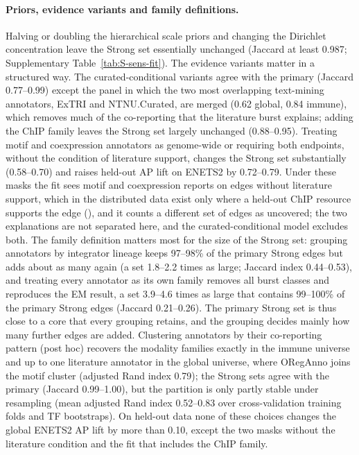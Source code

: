 \documentclass[11pt,a4paper]{article}
\begin{document}
\paragraph{Priors, evidence variants and family definitions.}
Halving or doubling the hierarchical scale priors and changing the Dirichlet concentration leave the Strong set essentially unchanged (Jaccard at least 0.987; Supplementary Table~\ref{tab:S-sens-fit}).
The evidence variants matter in a structured way.
The curated-conditional variants agree with the primary (Jaccard 0.77--0.99) except the panel in which the two most overlapping text-mining annotators, ExTRI and NTNU.Curated, are merged (0.62 global, 0.84 immune), which removes much of the co-reporting that the literature burst explains; adding the ChIP family leaves the Strong set largely unchanged (0.88--0.95).
Treating motif and coexpression annotators as genome-wide or requiring both endpoints, without the condition of literature support, changes the Strong set substantially (0.58--0.70) and raises held-out AP lift on ENETS2 by 0.72--0.79.
Under these masks the fit sees motif and coexpression reports on edges without literature support, which in the distributed data exist only where a held-out ChIP resource supports the edge (), and it counts a different set of edges as uncovered; the two explanations are not separated here, and the curated-conditional model excludes both.
The family definition matters most for the size of the Strong set: grouping annotators by integrator lineage keeps 97--98\% of the primary Strong edges but adds about as many again (a set 1.8--2.2 times as large; Jaccard index 0.44--0.53), and treating every annotator as its own family removes all burst classes and reproduces the EM result, a set 3.9--4.6 times as large that contains 99--100\% of the primary Strong edges (Jaccard 0.21--0.26).
The primary Strong set is thus close to a core that every grouping retains, and the grouping decides mainly how many further edges are added.
Clustering annotators by their co-reporting pattern (post hoc) recovers the modality families exactly in the immune universe and up to one literature annotator in the global universe, where ORegAnno joins the motif cluster (adjusted Rand index 0.79); the Strong sets agree with the primary (Jaccard 0.99--1.00), but the partition is only partly stable under resampling (mean adjusted Rand index 0.52--0.83 over cross-validation training folds and TF bootstraps).
On held-out data none of these choices changes the global ENETS2 AP lift by more than 0.10, except the two masks without the literature condition and the fit that includes the ChIP family.
\end{document}
